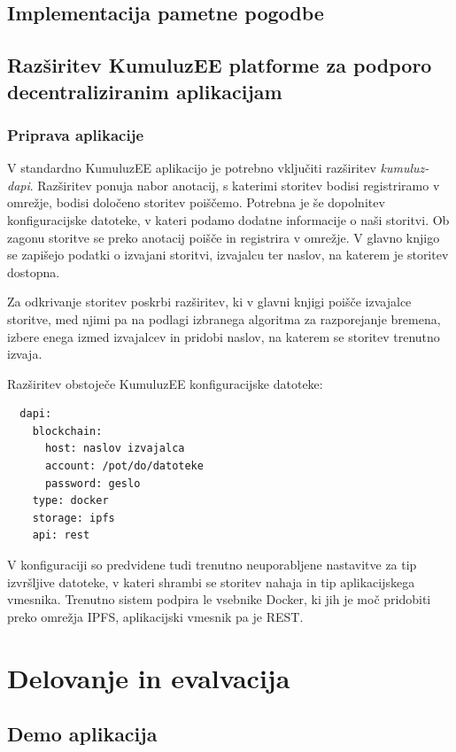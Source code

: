 \documentclass[a4paper, 12pt]{book}
\begin{document}
\section{Implementacija pametne pogodbe}


\section{Razširitev KumuluzEE platforme za podporo decentraliziranim aplikacijam}

\subsection{Priprava aplikacije}
V standardno KumuluzEE aplikacijo je potrebno vključiti razširitev \textit{kumuluz-dapi}. 
Razširitev ponuja nabor anotacij, s katerimi storitev bodisi registriramo v omrežje, bodisi določeno storitev poiščemo.
Potrebna je še dopolnitev konfiguracijske datoteke, v kateri podamo dodatne informacije o naši storitvi.
Ob zagonu storitve se preko anotacij poišče in registrira v omrežje.
V glavno knjigo se zapišejo podatki o izvajani storitvi, izvajalcu ter naslov, na katerem je storitev dostopna.

Za odkrivanje storitev poskrbi razširitev, ki v glavni knjigi poišče izvajalce storitve, med njimi pa na podlagi izbranega algoritma za razporejanje bremena, izbere enega izmed izvajalcev in pridobi naslov, na katerem se storitev trenutno izvaja.

Razširitev obstoječe KumuluzEE konfiguracijske datoteke:
\begin{lstlisting}
  dapi:
    blockchain:
      host: naslov izvajalca
      account: /pot/do/datoteke
      password: geslo
    type: docker
    storage: ipfs
    api: rest
\end{lstlisting}

V konfiguraciji so predvidene tudi trenutno neuporabljene nastavitve za tip izvršljive datoteke, v kateri shrambi se storitev nahaja in tip aplikacijskega vmesnika.
Trenutno sistem podpira le vsebnike Docker, ki jih je moč pridobiti preko omrežja IPFS, aplikacijski vmesnik pa je REST.


\chapter{Delovanje in evalvacija}

\section{Demo aplikacija}
\end{document}
